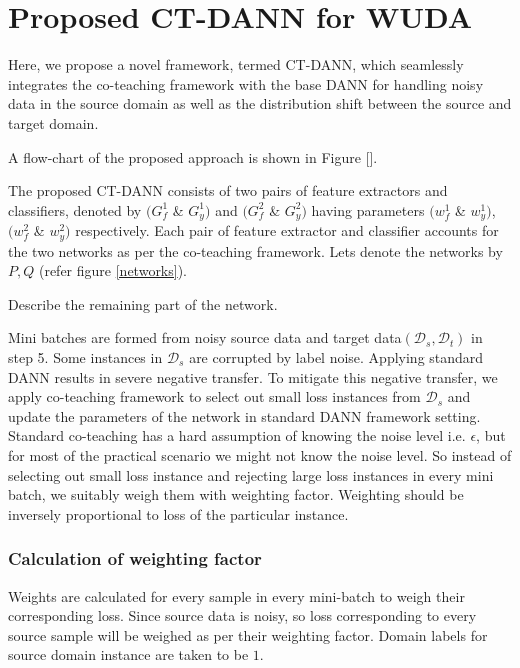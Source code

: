 
\section{Proposed CT-DANN for WUDA}
Here, we propose a novel framework, termed CT-DANN, which seamlessly integrates the co-teaching framework with the base DANN for handling noisy data in the source domain as well as the distribution shift between the source and target domain.

A flow-chart of the proposed approach is shown in Figure [].



The proposed CT-DANN consists of two pairs of feature extractors and classifiers, denoted by $(G_{f}^1$ \& $G_{y}^1)$ and $(G_{f}^2$ \& $G_{y}^2)$ having parameters $(w_{f}^1$ \& $w_{y}^1)$, $(w_{f}^2$ \& $w_{y}^2)$ respectively. 
Each pair of feature extractor and classifier accounts for the two networks as per the co-teaching framework.
Lets denote the networks by $P, Q$ (refer figure \ref{networks}). 

\color{red} Describe the remaining part of the network. \color{black}

Mini batches are formed from noisy source data and target data$(\mathcal{D}_s, \mathcal{D}_t)$ in step 5. Some instances in $\mathcal{D}_s$ are corrupted by label noise. Applying standard DANN results in severe negative transfer. To mitigate this negative transfer, we apply co-teaching framework to select out small loss instances from $\mathcal{D}_s$ and update the parameters of the network in standard DANN framework setting.\\
Standard co-teaching has a hard assumption of knowing the noise level i.e. $\epsilon$, but for most of the practical scenario we might not know the noise level. So instead of selecting out small loss instance and rejecting large loss instances in every mini batch, we suitably weigh them with weighting factor. Weighting should be inversely proportional to loss of the particular instance.

\subsubsection{Calculation of weighting factor}
Weights are calculated for every sample in every mini-batch to weigh their corresponding loss. Since source data is noisy, so loss corresponding to every source sample will be weighed as per their weighting factor. Domain labels for source domain instance are taken to be $1$.

